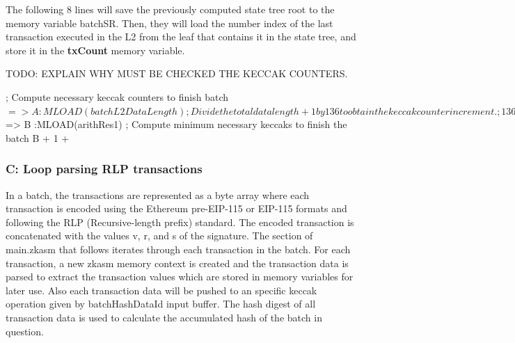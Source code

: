 The following 8 lines will save the previously computed state tree root to the memory variable batchSR. Then, they will load the number index of the last transaction executed in the L2 from the leaf that contains it in the state tree, and store it in the \textbf{txCount} memory variable.

TODO: EXPLAIN WHY MUST BE CHECKED THE KECCAK COUNTERS.



\begin{zkasm}

; Compute necessary keccak counters to finish batch
$ => A          :MLOAD(batchL2DataLength)
; Divide the total data length + 1 by 136 to obtain the keccak counter increment.
; 136 is the value used by the prover to increment keccak counters
A + 1                                   :MSTORE(arithA)
136                                     :MSTORE(arithB), CALL(divARITH); in: [arithA, arithB] out: [arithRes1: arithA/arithB, arithRes2: arithA%
$ => B                                  :MLOAD(arithRes1)
; Compute minimum necessary keccaks to finish the batch
B + 1 + %
\end{zkasm}



\subsubsection{C: Loop parsing RLP transactions}


In a batch, the transactions are represented as a byte array where each transaction is encoded using the Ethereum pre-EIP-115 or EIP-115 formats and following the RLP (Recursive-length prefix) standard. The encoded transaction is concatenated with the values v, r, and s of the signature. The section of main.zkasm that follows iterates through each transaction in the batch. For each transaction, a new zkasm memory context is created and the transaction data is parsed to extract the transaction values which are stored in memory variables for later use. Also each transaction data will be pushed to an specific keccak operation given by batchHashDataId  input buffer. The hash digest of all transaction data is used to calculate the accumulated hash of the batch in question.

